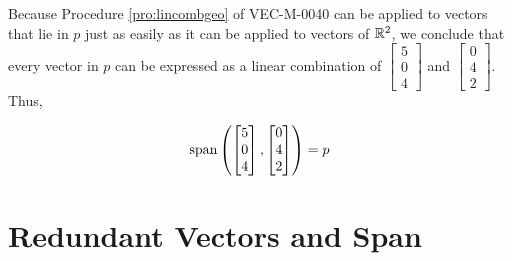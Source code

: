 \documentclass{ximera}
\begin{document}
\begin{example}
\begin{explanation}
Because Procedure \ref{pro:lincombgeo} of VEC-M-0040 can be applied to vectors that lie in $p$ just as easily as it can be applied to vectors of $\mathbb{R}^2$, we conclude that every vector in $p$ can be expressed as a linear combination of $\begin{bmatrix}5\\0\\4\end{bmatrix}$ and  $\begin{bmatrix}0\\4\\2\end{bmatrix}$.  Thus, 

$$\textnormal{span}\left(\begin{bmatrix}5\\0\\4\end{bmatrix}, \begin{bmatrix}0\\4\\2\end{bmatrix}\right)=p$$

\end{explanation}
\end{example}

\section*{Redundant Vectors and Span}
\end{document}
